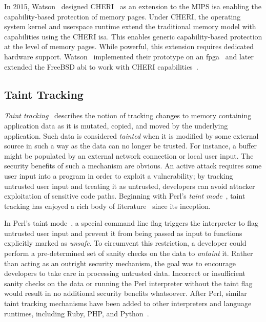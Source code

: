 In 2015, Watson \etal~designed CHERI~\cite{watson2015_cheri} as an extension to the MIPS
\gls{isa} enabling the capability-based protection of memory pages. Under CHERI, the
operating system kernel and userspace runtime extend the traditional memory model with
capabilities using the CHERI \gls{isa}. This enables generic capability-based protection at
the level of memory pages. While powerful, this extension requires dedicated hardware
support. Watson \etal~implemented their prototype on an \gls{fpga}~\cite{watson2015_cheri}
and later extended the FreeBSD \gls{abi} to work with CHERI capabilities~\cite{davis2019_cheriabi}.



\subsection{Taint Tracking}%
\label{ss:taint-tracking}

\textit{Taint tracking}~\cite{livshits2012_dynamic} describes the notion of tracking
changes to memory containing application data as it is mutated, copied, and moved by the
underlying application. Such data is considered \textit{tainted} when it is modified by
some external source in such a way as the data can no longer be trusted.  For instance,
a buffer might be populated by an external network connection or local user input. The
security benefits of such a mechanism are obvious. An active attack requires some user
input into a program in order to exploit a vulnerability; by tracking untrusted user input
and treating it as untrusted, developers can avoid attacker exploitation of sensitive code
paths. Beginning with Perl's \textit{taint mode}~\cite{hurst2004_perl}, taint tracking has
enjoyed a rich body of literature~\cite{livshits2012_dynamic, conti2010_taint,
bello2012_taint, ermolinskiy2010_towards, zavou2011_taint, yin2007_panorama,
zhu2011_taint_eraser, cheng2006_taint, clause2007_taint, chin2009_efficient} since its
inception.

In Perl's taint mode~\cite{hurst2004_perl}, a special command line flag triggers the
interpreter to flag untrusted user input and prevent it from being passed as input to
functions explicitly marked as \textit{unsafe}. To circumvent this restriction,
a developer could perform a pre-determined set of sanity checks on the data to
\textit{untaint} it. Rather than acting as an outright security mechanism, the goal was to
encourage developers to take care in processing untrusted data. Incorrect or insufficient
sanity checks on the data or running the Perl interpreter without the taint flag would
result in no additional security benefits whatsoever. After Perl, similar taint tracking
mechanisms have been added to other interpreters and language runtimes, including Ruby,
PHP, and Python~\cite{conti2010_taint}.

